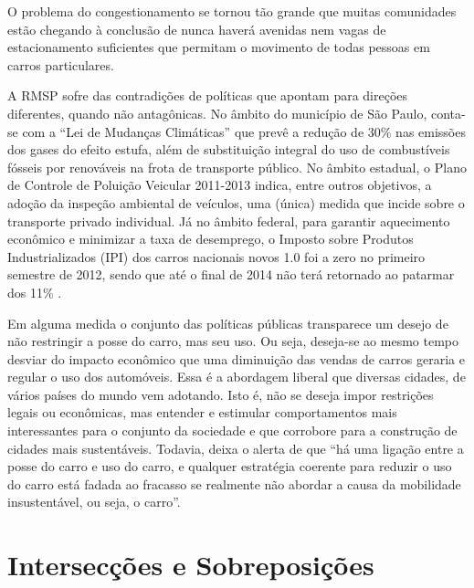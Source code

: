 \begin{citacao}
O problema do congestionamento se tornou tão grande que muitas comunidades estão chegando à conclusão de nunca haverá avenidas nem vagas de estacionamento suficientes que permitam o movimento de todas pessoas em carros particulares.
\end{citacao}

A RMSP sofre das contradições de políticas que apontam para direções diferentes, quando não antagônicas. No âmbito do município de São Paulo, conta-se com a ``Lei de Mudanças Climáticas'' \cite{LEICLIMASP2009} que prevê a redução de 30\% nas emissões dos gases do efeito estufa, além de substituição integral do uso de combustíveis fósseis por renováveis na frota de transporte público. No âmbito estadual, o Plano de Controle de Poluição Veicular 2011-2013 \cite{PCPV2011} indica, entre outros objetivos, a adoção da inspeção ambiental de veículos, uma (única) medida que incide sobre o transporte privado individual. Já no âmbito federal, para garantir aquecimento econômico e minimizar a taxa de desemprego, o Imposto sobre Produtos Industrializados (IPI) dos carros nacionais novos 1.0 foi a zero no primeiro semestre de 2012, sendo que até o final de 2014 não terá retornado ao patarmar dos 11\% \cite{FAZENDA2014}.

Em alguma medida o conjunto das políticas públicas transparece um desejo de não restringir a posse do carro, mas seu uso. Ou seja, deseja-se ao mesmo tempo desviar do impacto econômico que uma diminuição das vendas de carros geraria e regular o uso dos automóveis. Essa é a abordagem liberal que diversas cidades, de vários países do mundo vem adotando. Isto é, não se deseja impor restrições legais ou econômicas, mas entender e estimular comportamentos mais interessantes para o conjunto da sociedade e que corrobore para a construção de cidades mais sustentáveis. Todavia,  deixa o alerta de que ``há uma ligação entre a posse do carro e uso do carro, e qualquer estratégia coerente para reduzir o uso do carro está fadada ao fracasso se realmente não abordar a causa da mobilidade insustentável, ou seja, o carro''.



\clearpage
\section{Intersecções e Sobreposições}

